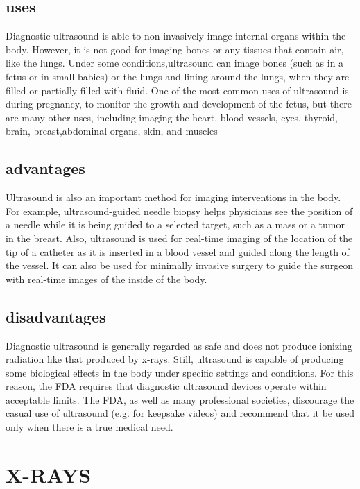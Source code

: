 \documentclass{article}
\begin{document}
\subsection{uses}


Diagnostic ultrasound is able to non-invasively image internal organs within the body. However, it is not good for imaging bones or any tissues that contain air, like the lungs. Under some conditions,ultrasound can image bones (such as in a fetus or in small babies) or the lungs and lining around the lungs, when they are filled or partially filled with fluid. One of the most common uses of ultrasound is during pregnancy, to monitor the growth and development of the fetus, but there are many other uses, including imaging the heart, blood vessels, eyes, thyroid, brain, breast,abdominal organs, skin, and muscles




\subsection{advantages}

Ultrasound is also an important method for imaging interventions in the body. For example, ultrasound-guided needle biopsy helps physicians see the position of a needle while it is being guided to a selected target, such as a mass or a tumor in the breast. Also, ultrasound is used for real-time imaging of the location of the tip of a catheter as it is inserted in a blood vessel and guided along the length of the vessel. It can also be used for minimally invasive surgery to guide the surgeon with real-time images of the inside of the body.
\subsection{disadvantages}
Diagnostic ultrasound is generally regarded as safe and does not produce ionizing radiation like that produced by x-rays. Still, ultrasound is capable of producing some biological effects in the body under specific settings and conditions. For this reason, the FDA requires that diagnostic ultrasound devices operate within acceptable limits. The FDA, as well as many professional societies, discourage the casual use of ultrasound (e.g. for keepsake videos) and recommend that it be used only when there is a true medical need.
\clearpage

\section{X-RAYS}
\end{document}
